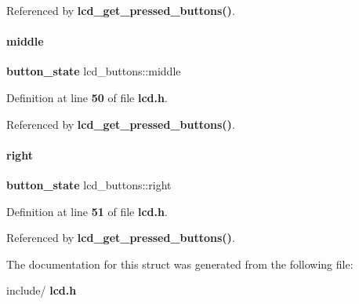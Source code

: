 Referenced by \textbf{ lcd\+\_\+get\+\_\+pressed\+\_\+buttons()}.

\mbox{\label{a00163_a293342810ac56f73979b08f144d6e6b9}} 
\paragraph{middle}
{\footnotesize\ttfamily \textbf{ button\+\_\+state} lcd\+\_\+buttons\+::middle}



Definition at line \textbf{ 50} of file \textbf{ lcd.\+h}.



Referenced by \textbf{ lcd\+\_\+get\+\_\+pressed\+\_\+buttons()}.

\mbox{\label{a00163_a2437d744e09ca1bb91ab4ca53ef77198}} 
\paragraph{right}
{\footnotesize\ttfamily \textbf{ button\+\_\+state} lcd\+\_\+buttons\+::right}



Definition at line \textbf{ 51} of file \textbf{ lcd.\+h}.



Referenced by \textbf{ lcd\+\_\+get\+\_\+pressed\+\_\+buttons()}.



The documentation for this struct was generated from the following file\+:\begin{DoxyCompactItemize}
\item 
include/\textbf{ lcd.\+h}\end{DoxyCompactItemize}

